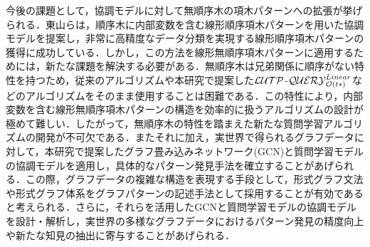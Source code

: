 今後の課題として，協調モデルに対して無順序木の項木パターンへの拡張が挙げられる．東山ら\cite{higashiyama-hinokuni2024}は，順序木に内部変数を含む線形順序項木パターンを用いた協調モデルを提案し，非常に高精度なデータ分類を実現する線形順序項木パターンの獲得に成功している．しかし，この方法を線形無順序項木パターンに適用するためには，新たな課題を解決する必要がある．無順序木は兄弟関係に順序がない特性を持つため，従来のアルゴリズムや本研究で提案した${\cal LUTP}$-${\cal QUERY}_{{\cal O}(t*)}^{Linear}$などのアルゴリズムをそのまま使用することは困難である．この特性により，内部変数を含む線形無順序項木パターンの構造を効率的に扱うアルゴリズムの設計が極めて難しい．したがって，無順序木の特性を踏まえた新たな質問学習アルゴリズムの開発が不可欠である．またそれに加え，実世界で得られるグラフデータに対して，本研究で提案したグラフ畳み込みネットワーク(GCN)と質問学習モデルの協調モデルを適用し，具体的なパターン発見手法を確立することがあげられる．この際，グラフデータの複雑な構造を表現する手段として，形式グラフ文法や形式グラフ体系をグラフパターンの記述手法として採用することが有効であると考えられる．さらに，それらを活用したGCNと質問学習モデルの協調モデルを設計・解析し，実世界の多様なグラフデータにおけるパターン発見の精度向上や新たな知見の抽出に寄与することがあげられる．
